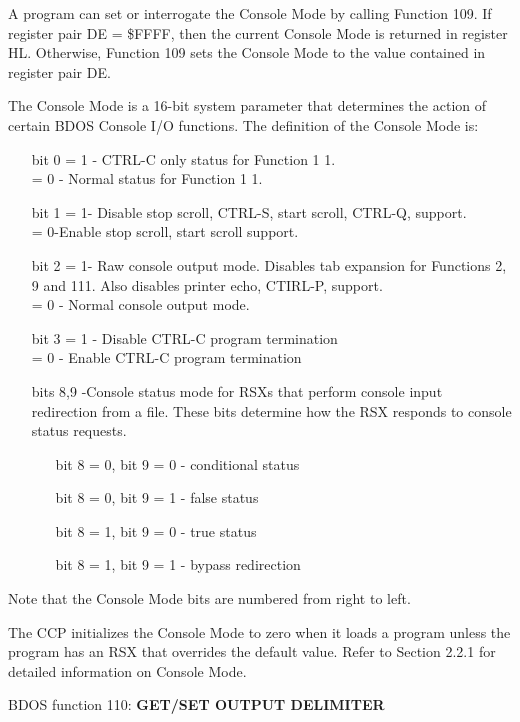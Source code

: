 A program can set or interrogate the Console Mode by calling Function
109. If register pair DE = \$FFFF, then the current Console Mode is
returned in register HL. Otherwise, Function 109 sets the Console Mode
to the value contained in register pair DE.

The Console Mode is a 16-bit system parameter that determines the
action of certain BDOS Console I/O functions. The definition of the
Console Mode is:

\begin{itemize}
\item[bit 0] = 1 - CTRL-C only status for Function 1 1.\\
  = 0 - Normal status for Function 1 1.
\item[bit 1] = 1- Disable stop scroll, CTRL-S, start scroll, CTRL-Q,
  support.\\
  = 0-Enable stop scroll, start scroll support.
\item[bit 2] = 1- Raw console output mode. Disables tab expansion for
  Functions 2, 9 and 111. Also disables printer echo, CTIRL-P,
  support.\\
  = 0 - Normal console output mode.
\item[bit 3] = 1 - Disable CTRL-C program termination\\
  = 0 - Enable CTRL-C program termination
\item[bits 8,9] -Console status mode for RSXs that perform console
  input redirection from a file. These bits determine how the RSX
  responds to console status requests.
  \begin{itemize}
  \item[] bit 8 = 0, bit 9 = 0 - conditional status
  \item[] bit 8 = 0, bit 9 = 1 - false status
  \item[] bit 8 = 1, bit 9 = 0 - true status
  \item[] bit 8 = 1, bit 9 = 1 - bypass redirection
  \end{itemize}
\end{itemize}

Note that the Console Mode bits are numbered from right to left.

The CCP initializes the Console Mode to zero when it loads a program
unless the program has an RSX that overrides the default value. Refer
to Section 2.2.1 for detailed information on Console Mode.

BDOS function 110: \textbf{GET/SET OUTPUT DELIMITER}

